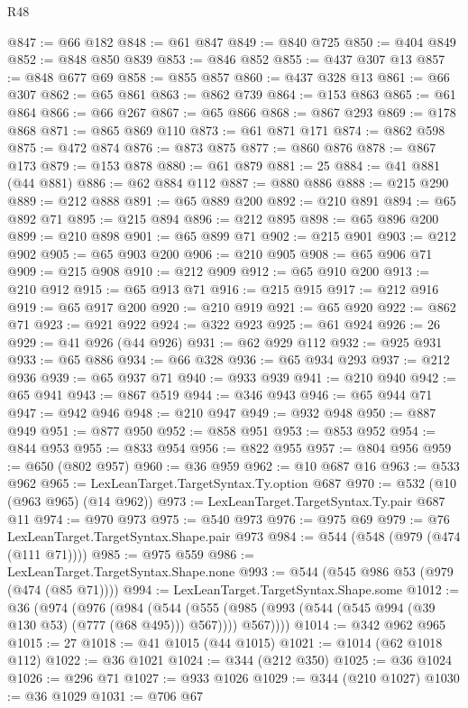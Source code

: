 \begin{lexlean}{R48}
\begin{coremodule}
@847 := @66 @182
@848 := @61 @847
@849 := @840 @725
@850 := @404 @849
@852 := @848 @850 @839
@853 := @846 @852
@855 := @437 @307 @13
@857 := @848 @677 @69
@858 := @855 @857
@860 := @437 @328 @13
@861 := @66 @307
@862 := @65 @861
@863 := @862 @739
@864 := @153 @863
@865 := @61 @864
@866 := @66 @267
@867 := @65 @866
@868 := @867 @293
@869 := @178 @868
@871 := @865 @869 @110
@873 := @61 @871 @171
@874 := @862 @598
@875 := @472 @874
@876 := @873 @875
@877 := @860 @876
@878 := @867 @173
@879 := @153 @878
@880 := @61 @879
@881 := 25
@884 := @41 @881 (@44 @881)
@886 := @62 @884 @112
@887 := @880 @886
@888 := @215 @290
@889 := @212 @888
@891 := @65 @889 @200
@892 := @210 @891
@894 := @65 @892 @71
@895 := @215 @894
@896 := @212 @895
@898 := @65 @896 @200
@899 := @210 @898
@901 := @65 @899 @71
@902 := @215 @901
@903 := @212 @902
@905 := @65 @903 @200
@906 := @210 @905
@908 := @65 @906 @71
@909 := @215 @908
@910 := @212 @909
@912 := @65 @910 @200
@913 := @210 @912
@915 := @65 @913 @71
@916 := @215 @915
@917 := @212 @916
@919 := @65 @917 @200
@920 := @210 @919
@921 := @65 @920
@922 := @862 @71
@923 := @921 @922
@924 := @322 @923
@925 := @61 @924
@926 := 26
@929 := @41 @926 (@44 @926)
@931 := @62 @929 @112
@932 := @925 @931
@933 := @65 @886
@934 := @66 @328
@936 := @65 @934 @293
@937 := @212 @936
@939 := @65 @937 @71
@940 := @933 @939
@941 := @210 @940
@942 := @65 @941
@943 := @867 @519
@944 := @346 @943
@946 := @65 @944 @71
@947 := @942 @946
@948 := @210 @947
@949 := @932 @948
@950 := @887 @949
@951 := @877 @950
@952 := @858 @951
@953 := @853 @952
@954 := @844 @953
@955 := @833 @954
@956 := @822 @955
@957 := @804 @956
@959 := @650 (@802 @957)
@960 := @36 @959
@962 := @10 @687 @16
@963 := @533 @962
@965 := LexLeanTarget.TargetSyntax.Ty.option @687
@970 := @532 (@10 (@963 @965) (@14 @962))
@973 := LexLeanTarget.TargetSyntax.Ty.pair @687 @11
@974 := @970 @973
@975 := @540 @973
@976 := @975 @69
@979 := @76 LexLeanTarget.TargetSyntax.Shape.pair @973
@984 := @544 (@548 (@979 (@474 (@111 @71))))
@985 := @975 @559
@986 := LexLeanTarget.TargetSyntax.Shape.none
@993 := @544 (@545 @986 @53 (@979 (@474 (@85 @71))))
@994 := LexLeanTarget.TargetSyntax.Shape.some
@1012 := @36
    (@974
      (@976
        (@984
          (@544
            (@555 (@985 (@993 (@544 (@545 @994 (@39 @130 @53) (@777 (@68 @495))) @567))))
            @567))))
@1014 := @342 @962 @965
@1015 := 27
@1018 := @41 @1015 (@44 @1015)
@1021 := @1014 (@62 @1018 @112)
@1022 := @36 @1021
@1024 := @344 (@212 @350)
@1025 := @36 @1024
@1026 := @296 @71
@1027 := @933 @1026
@1029 := @344 (@210 @1027)
@1030 := @36 @1029
@1031 := @706 @67

\end{coremodule}
\end{lexlean}
